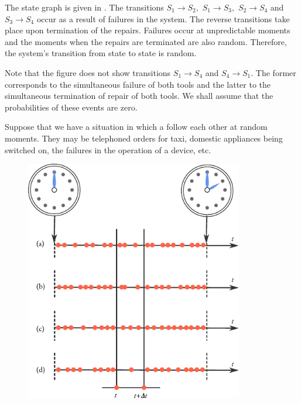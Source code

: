 The state graph is given in . The transitions
$S_{1} \to S_{2}, \,\, S_{1} \to S_{3}, \,\, S_{2} \to S_{4}$ and
$S_{3} \to S_{4}$ occur as a result of failures in the system. The
reverse transitions take place upon termination of the
repairs. Failures occur at unpredictable moments and the moments when
the repairs are terminated are also random. Therefore, the system's
transition from state to state is random.



 Note that the figure does not show transitions $S_{1} \to S_{4}$ and
 $S_{4} \to S_{1}$.  The former corresponds to the simultaneous
 failure of both tools and the latter to the simultaneous termination
 of repair of both tools. We shall assume that the probabilities of
 these events are zero.

  Suppose that we have a situation in which a
  follow each other at random moments. They
 may be telephoned orders for taxi, domestic appliances being switched
 on, the failures in the operation of a device, etc.

 \begin{figure}[!ht]
 \centering
 \includegraphics[width=0.85\textwidth]{figures/event-arrival.pdf}
 \end{figure}


